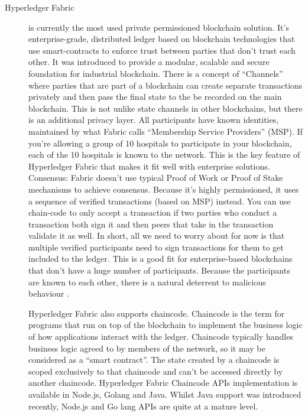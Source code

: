 \begin{description}
\item[Hyperledger Fabric] is currently the most used private permissioned blockchain solution. It's enterprise-grade, distributed ledger based on blockchain technologies that use smart-contracts to enforce trust between parties that don't trust each other. It was introduced to provide a modular, scalable and secure foundation for industrial blockchain. 
There is a concept of “Channels” where parties that are part of a blockchain can create separate transactions privately and then pass the final state to the be recorded on the main blockchain. This is not unlike state channels in other blockchains, but there is an additional privacy layer.
All participants have known identities, maintained by what Fabric calls “Membership Service Providers” (MSP). If you’re allowing a group of 10 hospitals to participate in your blockchain, each of the 10 hospitals is known to the network. This is the key feature of Hyperledger Fabric that makes it fit well with enterprise solutions.
Consensus: Fabric doesn't use typical Proof of Work or Proof of Stake mechanisms to achieve consensus. Because it’s highly permissioned, it uses a sequence of verified transactions (based on MSP) instead. You can use chain-code to only accept a transaction if two parties who conduct a transaction both sign it and then peers that take in the transaction validate it as well. In short, all we need to worry about for now is that multiple verified participants need to sign transactions for them to get included to the ledger. This is a good fit for enterprise-based blockchains that don’t have a huge number of participants. Because the participants are known to each other, there is a natural deterrent to malicious behaviour \cite{coral_start}. 

Hyperledger Fabric also supports chaincode. Chaincode is the term for programs that run on top of the blockchain to implement the business logic of how applications interact with the ledger. Chaincode typically handles business logic agreed to by members of the network, so it may be considered as a “smart contract”. The state created by a chaincode is scoped exclusively to that chaincode and can’t be accessed directly by another chaincode. Hyperledger Fabric Chaincode APIs implementation is available in Node.js, Golang and Java. Whilst Java support was introduced recently, Node.js and Go lang APIs are quite at a mature level. 


\end{description}
